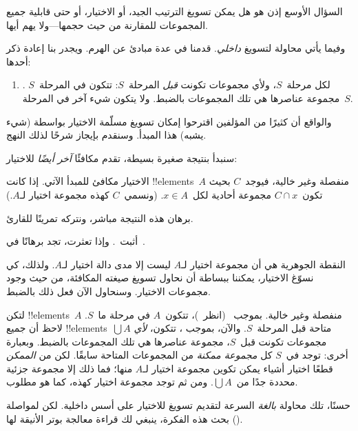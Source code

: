 \documentclass[../../../include/open-logic-section]{subfiles}
\begin{document}

السؤال الأوسع إذن هو هل يمكن تسويغ الترتيب الجيد، أو الاختيار، أو
حتى قابلية جميع المجموعات للمقارنة من حيث حجمها---ولا يهم أيها.

وفيما يأتي محاولة لتسويغ \emph{داخلي}. قدمنا في
 عدة مبادئ عن الهرم. ويجدر بنا إعادة ذكر أحدها:
\begin{enumerate}
	\item[] \stagesacc. لكل مرحلة~$S$، ولأي مجموعات تكونت
	\emph{قبل} المرحلة~$S$: تتكون في المرحلة~$S$ مجموعة عناصرها هي تلك
	المجموعات بالضبط. ولا يتكون شيء آخر في المرحلة~$S$.
\end{enumerate}
والواقع أن كثيرًا من المؤلفين اقترحوا إمكان تسويغ مسلّمة الاختيار
بواسطة (شيء يشبه) هذا المبدأ. وسنقدم بإيجاز شرحًا لذلك النهج.

سنبدأ بنتيجة صغيرة بسيطة، تقدم مكافئًا \emph{آخر أيضًا} للاختيار:

\begin{thm}[في $\ZF$]
الاختيار مكافئ للمبدأ الآتي. إذا كانت !!{element}s~$A$ منفصلة وغير
خالية، فيوجد~$C$ بحيث تكون~$C \cap x$ مجموعة أحادية لكل~$x \in A$.
(ونسمي~$C$ كهذه {مجموعة اختيار} لـ$A$.)
\end{thm}

برهان هذه النتيجة مباشر، ونتركه تمرينًا للقارئ.

\begin{prob}
أثبت~. وإذا تعثرت، تجد
برهانًا في~\cite[pp.~242--3]{Potter2004}.
\end{prob}

النقطة الجوهرية هي أن مجموعة اختيار لـ$A$ ليست إلا مدى دالة اختيار
لـ$A$. ولذلك، كي نسوّغ الاختيار، يمكننا ببساطة أن نحاول تسويغ صيغته
المكافئة، من حيث وجود مجموعات الاختيار. وسنحاول الآن فعل ذلك بالضبط.

لتكن !!{element}s~$A$ منفصلة وغير خالية. بموجب~\stageshier{}
(انظر~)، تتكون~$A$ في مرحلة ما~$S$. لاحظ أن جميع
!!{element}s~$\bigcup A$ متاحة قبل المرحلة~$S$. والآن، بموجب
\stagesacc{}، تتكون، \emph{لأي} مجموعات تكونت قبل~$S$، مجموعة عناصرها
هي تلك المجموعات بالضبط. وبعبارة أخرى: توجد في~$S$ كل \emph{مجموعة
ممكنة} من المجموعات المتاحة سابقًا. لكن من \emph{الممكن} قطعًا
اختيار أشياء يمكن تكوين مجموعة اختيار لـ$A$ منها؛ فما ذلك إلا مجموعة
جزئية محددة جدًا من~$\bigcup A$. ومن ثم توجد مجموعة اختيار كهذه، كما
هو مطلوب.

حسنًا، تلك محاولة \emph{بالغة} السرعة لتقديم تسويغ للاختيار على أسس
داخلية. لكن لمواصلة بحث هذه الفكرة، ينبغي لك قراءة معالجة بوتر
الأنيقة لها (\citeyear[\S14.8]{Potter2004}).
\end{document}
